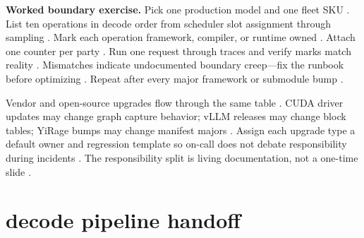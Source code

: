 \textbf{Worked boundary exercise.} Pick one production model and one fleet SKU \citep{patel2025llminference,yirage2026,chen2020compilerbasedhardw,dlbook}. List ten operations in decode order from scheduler slot assignment through sampling \citep{kwon2023vllm,patel2025llminference,yirage2026,chen2020compilerbasedhardw,dlbook}. Mark each operation framework, compiler, or runtime owned \citep{yirage2026,chen2020compilerbasedhardw,patel2025llminference,kwon2023vllm,dlbook}. Attach one counter per party \citep{taxbreak2026,memoryfloor2026,patel2025llminference,yirage2026,chen2020compilerbasedhardw,dlbook}. Run one request through traces and verify marks match reality \citep{patel2025llminference,yirage2026,chen2020compilerbasedhardw,kwon2023vllm,dlbook}. Mismatches indicate undocumented boundary creep---fix the runbook before optimizing \citep{patel2025llminference,yirage2026,chen2020compilerbasedhardw,dlbook}. Repeat after every major framework or submodule bump \citep{yirage2026,chen2020compilerbasedhardw,kwon2023vllm,patel2025llminference,dlbook}.

Vendor and open-source upgrades flow through the same table \citep{patel2025llminference,yirage2026,chen2020compilerbasedhardw,kwon2023vllm,dlbook}. CUDA driver updates may change graph capture behavior; vLLM releases may change block tables; YiRage bumps may change manifest majors \citep{nvidia2024cudagraphs,kwon2023vllm,yirage2026,chen2020compilerbasedhardw,patel2025llminference,dlbook}. Assign each upgrade type a default owner and regression template so on-call does not debate responsibility during incidents \citep{patel2025llminference,yirage2026,chen2020compilerbasedhardw,taxbreak2026,memoryfloor2026,kwon2023vllm,dlbook}. The responsibility split is living documentation, not a one-time slide \citep{patel2025llminference,yirage2026,chen2020compilerbasedhardw,dlbook}.

\section{decode pipeline handoff}
\label{sec:ch30_decode_pipeline_handoff}


